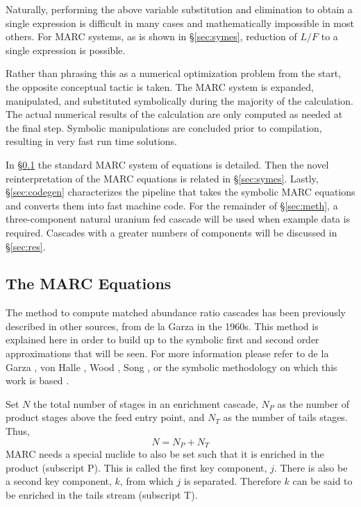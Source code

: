 \documentclass{ansconf}
\begin{document}
Naturally, performing the above variable substitution and elimination to obtain a 
single expression is difficult in many cases and mathematically impossible in most 
others.  For MARC systems, as is shown in \S \ref{sec:symes}, reduction of $L/F$
to a single expression is possible.

Rather than phrasing this as a numerical optimization problem from the start, the 
opposite conceptual tactic is taken.  The MARC system is expanded, manipulated, 
and substituted symbolically during the majority of the calculation.  The actual 
numerical results of the calculation are only computed as needed at the final step.
Symbolic manipulations are concluded prior to compilation, resulting in 
very fast run time solutions.

In \S \ref{sec:marceq} the standard MARC system of equations is detailed. 
Then the novel reinterpretation of the MARC equations is related in 
\S \ref{sec:symes}.  
Lastly, \S \ref{sec:codegen} characterizes the pipeline that takes the symbolic MARC 
equations and converts them into fast machine code.  
For the remainder of \S \ref{sec:meth}, a three-component natural uranium fed 
cascade will be used when example data is required.
Cascades with a greater numbers of components will be discussed in \S \ref{sec:res}.

\subsection{The MARC Equations}
\label{sec:marceq}
The method to compute matched abundance ratio cascades has been 
previously described in other sources, from de la Garza in the
1960s. This method is explained here in order to build up to the symbolic first and 
second order approximations that will be seen.
For more information please refer to de la Garza
\cite{DelaGarza1969}, von Halle \cite{VonHalle1987}, Wood \cite{Wood1999}, 
Song \cite{doi:10.1080/01496391003793884}, or the symbolic methodology on which this 
work is based \cite{Scopatz2012}.

Set $N$ the total number of stages in an enrichment cascade, $N_P$ as the number of 
product stages above the feed entry point, and $N_T$ as the number of tails
stages.  Thus,
\begin{equation}
N = N_P + N_T
\end{equation}
MARC needs a special nuclide to also be set such that it is enriched in the 
product (subscript P).  This is called the first key component, $j$.  
There is also be a second key component, $k$, from which $j$ is 
separated. Therefore $k$ can be said to be enriched in the tails stream (subscript T).
\end{document}
